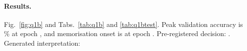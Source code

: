 \paragraph{Results.} Fig.~\ref{fig:q1b} and Tabs.~\ref{tab:q1b} and \ref{tab:q1btest}. Peak validation accuracy is
\% at epoch , and memorisation onset is at epoch . Pre-registered decision:
\textbf{}. Generated interpretation:

